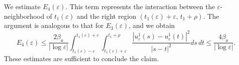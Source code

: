 \documentclass[12pt]{article}
\numberwithin{equation}{section}
\begin{document}
We estimate $E_{4}(\varepsilon)$. This term represents the interaction between the $\varepsilon$-neigh\-bor\-hood of $t_1(\varepsilon)$ and the right region $(t_1(\varepsilon)+\varepsilon,\, t_1+\rho)$. The argument is analogous to that for $E_3(\varepsilon)$, and we obtain
\begin{equation*}
    E_{4}(\varepsilon)\leq\frac{2\beta_{a}}{|\log\varepsilon|}\int_{t_{1}(\varepsilon)-\varepsilon}^{t_{1}(\varepsilon)+\varepsilon}\int_{t_{1}(\varepsilon)+\varepsilon}^{t_{1}+\rho}\frac{\left|u^{1}_{\varepsilon}(s)-u^{1}_{\varepsilon}(t)\right|^2}{\left|s-t\right|^2}ds\,dt\le\frac{4\beta_{a}}{|\log\varepsilon|}.
\end{equation*}
These estimates are sufficient to conclude the claim.
\end{document}
